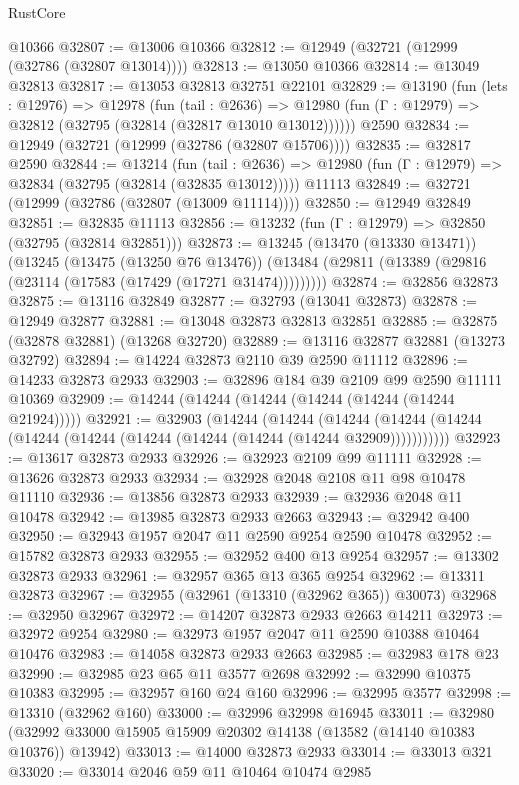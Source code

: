 \begin{lexlean}{RustCore}
\begin{coremodule}
    @10366
@32807 := @13006 @10366
@32812 := @12949 (@32721 (@12999 (@32786 (@32807 @13014))))
@32813 := @13050 @10366
@32814 := @13049 @32813
@32817 := @13053 @32813 @32751 @22101
@32829 := @13190
    (fun (lets : @12976) =>
    @12978
      (fun (tail : @2636) =>
      @12980 (fun (Γ : @12979) => @32812 (@32795 (@32814 (@32817 @13010 @13012))))))
    @2590
@32834 := @12949 (@32721 (@12999 (@32786 (@32807 @15706))))
@32835 := @32817 @2590
@32844 := @13214
    (fun (tail : @2636) => @12980 (fun (Γ : @12979) => @32834 (@32795 (@32814 (@32835 @13012)))))
    @11113
@32849 := @32721 (@12999 (@32786 (@32807 (@13009 @11114))))
@32850 := @12949 @32849
@32851 := @32835 @11113
@32856 := @13232 (fun (Γ : @12979) => @32850 (@32795 (@32814 @32851)))
@32873 := @13245
    (@13470 (@13330 @13471))
    (@13245
      (@13475 (@13250 @76 @13476))
      (@13484 (@29811 (@13389 (@29816 (@23114 (@17583 (@17429 (@17271 @31474)))))))))
@32874 := @32856 @32873
@32875 := @13116 @32849
@32877 := @32793 (@13041 @32873)
@32878 := @12949 @32877
@32881 := @13048 @32873 @32813 @32851
@32885 := @32875 (@32878 @32881) (@13268 @32720)
@32889 := @13116 @32877 @32881 (@13273 @32792)
@32894 := @14224 @32873 @2110 @39 @2590 @11112
@32896 := @14233 @32873 @2933
@32903 := @32896 @184 @39 @2109 @99 @2590 @11111 @10369
@32909 := @14244 (@14244 (@14244 (@14244 (@14244 (@14244 @21924)))))
@32921 := @32903
    (@14244
      (@14244
        (@14244 (@14244 (@14244 (@14244 (@14244 (@14244 (@14244 (@14244 (@14244 @32909)))))))))))
@32923 := @13617 @32873 @2933
@32926 := @32923 @2109 @99 @11111
@32928 := @13626 @32873 @2933
@32934 := @32928 @2048 @2108 @11 @98 @10478 @11110
@32936 := @13856 @32873 @2933
@32939 := @32936 @2048 @11 @10478
@32942 := @13985 @32873 @2933 @2663
@32943 := @32942 @400
@32950 := @32943 @1957 @2047 @11 @2590 @9254 @2590 @10478
@32952 := @15782 @32873 @2933
@32955 := @32952 @400 @13 @9254
@32957 := @13302 @32873 @2933
@32961 := @32957 @365 @13 @365 @9254
@32962 := @13311 @32873
@32967 := @32955 (@32961 (@13310 (@32962 @365)) @30073)
@32968 := @32950 @32967
@32972 := @14207 @32873 @2933 @2663 @14211
@32973 := @32972 @9254
@32980 := @32973 @1957 @2047 @11 @2590 @10388 @10464 @10476
@32983 := @14058 @32873 @2933 @2663
@32985 := @32983 @178 @23
@32990 := @32985 @23 @65 @11 @3577 @2698
@32992 := @32990 @10375 @10383
@32995 := @32957 @160 @24 @160
@32996 := @32995 @3577
@32998 := @13310 (@32962 @160)
@33000 := @32996 @32998 @16945
@33011 := @32980 (@32992 @33000 @15905 @15909 @20302 @14138 (@13582 (@14140 @10383 @10376)) @13942)
@33013 := @14000 @32873 @2933
@33014 := @33013 @321
@33020 := @33014 @2046 @59 @11 @10464 @10474 @2985

\end{coremodule}
\end{lexlean}
